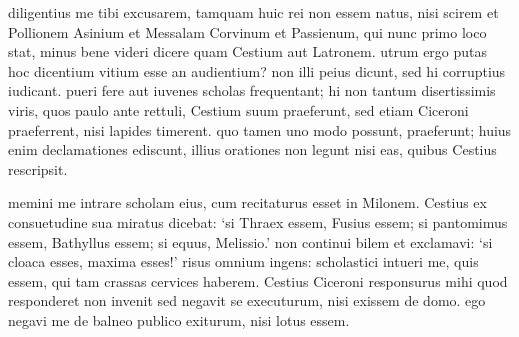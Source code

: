 diligentius me tibi excusarem, tamquam huic rei non essem natus, nisi scirem et Pollionem Asinium et Messalam Corvinum et Passienum, qui nunc primo loco stat, minus bene videri dicere quam Cestium aut Latronem. utrum ergo putas hoc dicentium vitium esse an audientium? non illi peius dicunt, sed hi corruptius iudicant. pueri fere aut iuvenes scholas frequentant; hi non tantum disertissimis viris, quos paulo ante rettuli, Cestium suum praeferunt, sed etiam Ciceroni praeferrent, nisi lapides timerent. quo tamen uno modo possunt, praeferunt; huius enim declamationes ediscunt, illius orationes non legunt nisi eas, quibus Cestius rescripsit.

memini me intrare scholam eius, cum recitaturus esset in Milonem. Cestius ex consuetudine sua miratus dicebat: `si Thraex essem, Fusius essem; si pantomimus essem, Bathyllus essem; si equus, Melissio.' non continui bilem et exclamavi: `si cloaca esses, maxima esses!' risus omnium ingens: scholastici intueri me, quis essem, qui tam crassas cervices haberem. Cestius Ciceroni responsurus mihi quod responderet non invenit sed negavit se executurum, nisi exissem de domo. ego negavi me de balneo publico exiturum, nisi lotus essem.

